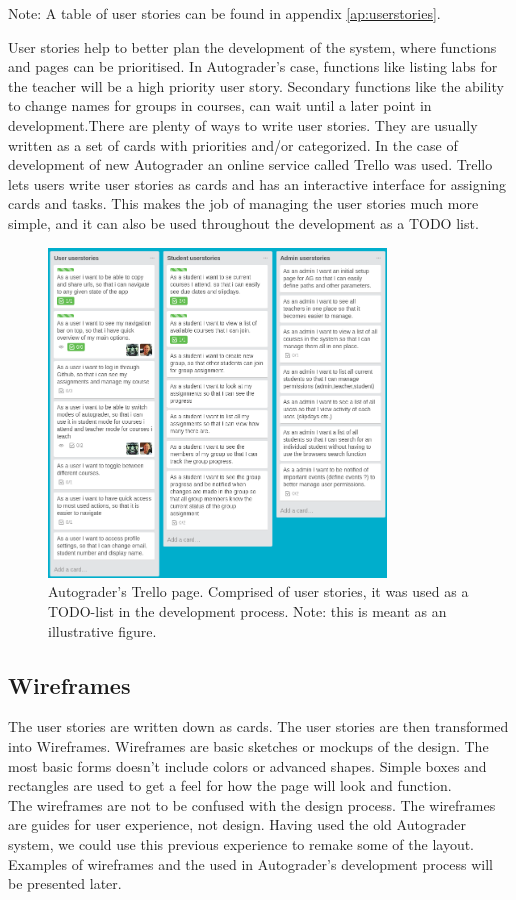 Note: A table of user stories can be found in appendix \ref{ap:userstories}.

User stories help to better plan the development of the system, where functions and pages can be prioritised. In Autograder's case, functions like listing labs for the teacher will be a high priority user story. Secondary functions like the ability to change names for groups in courses, can wait until a later point in development.There are plenty of ways to write user stories. They are usually written as a set of cards with priorities and/or categorized. In the case of development of new Autograder an online service called Trello \cite{trellopage} was used. Trello lets users write user stories as cards and has an interactive interface for assigning cards and tasks. This makes the job of managing the user stories much more simple, and it can also be used throughout the development as a TODO list.
\begin{figure}[h]
    \centering
    \includegraphics[width=0.8\textwidth]{./graphics/trello.png}
    \caption{Autograder's Trello page. Comprised of user stories, it was used as a TODO-list in the development process. Note: this is meant as an illustrative figure.}
    \label{fig:View of the trello page we used in the development process}
\end{figure}

\subsection{Wireframes}
The user stories are written down as cards. The user stories are then transformed into Wireframes. Wireframes are basic sketches or mockups of the design. The most basic forms doesn't include colors or advanced shapes. Simple boxes and rectangles are used to get a feel for how the page will look and function.
\\The wireframes are not to be confused with the design process. The wireframes are guides for user experience, not design. Having used the old Autograder system, we could use this previous experience to remake some of the layout. Examples of wireframes and the used in Autograder's development process will be presented later.

